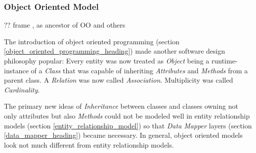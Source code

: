 %
%
%
%
%
%
%

\subsubsection{Object Oriented Model}
\label{object_oriented_model_heading}

?? frame \cite{sowa}, as ancestor of OO and others

The introduction of object oriented programming (section
\ref{object_oriented_programming_heading}) made another software design
philosophy popular:
Every entity was now treated as \emph{Object} being a runtime-instance of a
\emph{Class} that was capable of inheriting \emph{Attributes} and \emph{Methods}
from a parent class. A \emph{Relation} was now called \emph{Association}.
Multiplicity was called \emph{Cardinality}.

The primary new ideas of \emph{Inheritance} between classes and classes owning not
only attributes but also \emph{Methods} could not be modeled well in entity relationship
models (section \ref{entity_relationship_model}) so that \emph{Data Mapper} layers
(section \ref{data_mapper_heading}) became necessary. In general, object oriented
models look not much different from entity relationship models.
